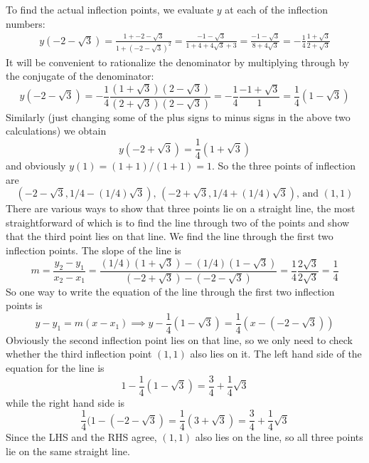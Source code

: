 \documentclass{article}
\begin{document}
\begin{enumerate}
  To find the actual inflection points, we evaluate $y$ at each of the
  inflection numbers:
  \begin{align*}
    y(-2-\sqrt{3}) = \frac{1+-2-\sqrt{3}}{1+(-2-\sqrt{3})^2}
    = \frac{-1-\sqrt{3}}{1+4+4\sqrt{3}+3}
    = \frac{-1-\sqrt{3}}{8+4\sqrt{3}}
    = -\frac{1}{4} \frac{1+\sqrt{3}}{2+\sqrt{3}}
  \end{align*}
  It will be convenient to rationalize the denominator by multiplying
  through by the conjugate of the denominator:
  \begin{equation*}
    y(-2-\sqrt{3}) 
    = -\frac{1}{4}\frac{(1+\sqrt{3})(2-\sqrt{3})}{(2+\sqrt{3})(2-\sqrt{3})}
    = -\frac{1}{4} \frac{-1+\sqrt{3}}{1}
    = \frac{1}{4} (1-\sqrt{3})
  \end{equation*}
  Similarly (just changing some of the plus signs to minus signs in
  the above two calculations) we obtain
  \begin{equation*}
    y(-2+\sqrt{3})
    = \frac{1}{4} (1+\sqrt{3})
  \end{equation*}
  and obviously $y(1)=(1+1)/(1+1)=1$.  So the three points of inflection
  are
  \begin{equation*}
    \mbox{$(-2-\sqrt{3},1/4-(1/4)\sqrt{3})$,
      $(-2+\sqrt{3},1/4+(1/4)\sqrt{3})$,
      and $(1,1)$}
  \end{equation*}
  There are various ways to show that three points lie on a straight
  line, the most straightforward of which is to find the line through
  two of the points and show that the third point lies on that line.
  We find the line through the first two inflection points.  The slope
  of the line is
  \begin{equation*}
    m = \frac{y_2-y_1}{x_2-x_1}
    = \frac{(1/4)(1+\sqrt{3})-(1/4)(1-\sqrt{3})}{(-2+\sqrt{3})-(-2-\sqrt{3})}
    = \frac{1}{4} \frac{2\sqrt{3}}{2\sqrt{3}} = \frac{1}{4}
  \end{equation*}
  So one way to write the equation of the line through the first two 
  inflection points is
  \begin{equation*}
    y-y_1 = m(x-x_1) \implies
    y-\frac{1}{4}(1-\sqrt{3}) = \frac{1}{4} (x-(-2-\sqrt{3}))
  \end{equation*}
  Obviously the second inflection point lies on that line, so we only
  need to check whether the third inflection point $(1,1)$ also lies
  on it.  The left hand side of the equation for the line is
  \begin{equation*}
    1-\frac{1}{4}(1-\sqrt{3}) = \frac{3}{4} + \frac{1}{4}\sqrt{3}
  \end{equation*}
  while the right hand side is
  \begin{equation*}
    \frac{1}{4} (1-(-2-\sqrt{3}) = \frac{1}{4} (3+\sqrt{3})
    = \frac{3}{4} + \frac{1}{4} \sqrt{3}
  \end{equation*}
  Since the LHS and the RHS agree, $(1,1)$ also lies on the line, so
  all three points lie on the same straight line.
\end{enumerate}
\end{document}
